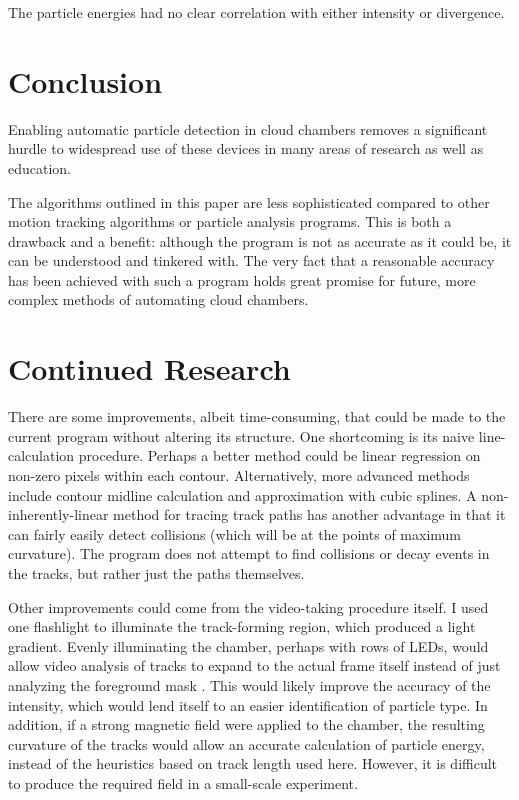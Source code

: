 \documentclass[notitlepage]{article}
\begin{document}
The particle energies had no clear correlation with either intensity or divergence.

\section{Conclusion}

Enabling automatic particle detection in cloud chambers removes a significant hurdle to widespread use of these devices in many areas of research as well as education.
  
The algorithms outlined in this paper are less sophisticated compared to other motion tracking algorithms or particle analysis programs.  This is both a drawback and a benefit: although the program is not as accurate as it could be, it can be understood and tinkered with.  The very fact that a reasonable accuracy has been achieved with such a program holds great promise for future, more complex methods of automating cloud chambers. 

\section{Continued Research}

There are some improvements, albeit time-consuming, that could be made to the current program without altering its structure.  One shortcoming is its naive line-calculation procedure.  Perhaps a better method could be linear regression on non-zero pixels within each contour.  Alternatively, more advanced methods include contour midline calculation and approximation with cubic splines.  A non-inherently-linear method for tracing track paths has another advantage in that it can fairly easily detect collisions (which will be at the points of maximum curvature).  The program does not attempt to find collisions or decay events in the tracks, but rather just the paths themselves. 
 
Other improvements could come from the video-taking procedure itself.  I used one flashlight to illuminate the track-forming region, which produced a light gradient.  Evenly illuminating the chamber, perhaps with rows of LEDs, would allow video analysis of tracks to expand to the actual frame itself instead of just analyzing the foreground mask \cite{wayne}.  This would likely improve the accuracy of the intensity, which would lend itself to an easier identification of particle type.  In addition, if a strong magnetic field were applied to the chamber, the resulting curvature of the tracks would allow an accurate calculation of particle energy, instead of the heuristics based on track length used here.   However, it is difficult to produce the required field in a small-scale experiment.
\end{document}
